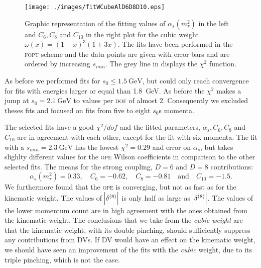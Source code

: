\documentclass[../../index.tex]{subfiles}
\begin{document}
\begin{figure}
  \centering \texttt{[image: ./images/fitWCubeAlD6D8D10.eps]}
  \caption{Graphic representation of the fitting values of
    \(\alpha_s(m_\tau^2)\) in the left and \(C_6, C_8\) and \(C_{10}\) in the
    right plot for the cubic weight \(\omega(x)=(1-x)^3(1+3x)\). The fits have
    been performed in the \textsc{fopt} scheme and the data points are given
    with error bars and are ordered by increasing \(s_{min}\). The grey line in
    displays the \(\chi^2\) function.}
  \label{fig:fitWCubeAlpha}
\end{figure}

As before we performed fits for \(s_0 \leq \SI{1.5}{\giga\eV}\), but could only
reach convergence for fits with energies larger or equal than
\SI{1.8}{\giga\eV}. As before the \(\chi^2\) makes a jump at
\(s_0=\SI{2.1}{\giga\eV}\) to values per \textsc{dof} of almost \(2\).
Consequently we excluded theses fits and focused on fits from five to eight
\(s_0\)s momenta.

The selected fits have a good \(\chi^2/dof\) and the fitted parameters,
\(\alpha_s, C_6, C_8\) and \(C_{10}\) are in agreement with each other, except
for the fit with six momenta. The fit with a \(s_{min}=\SI{2.3}{\giga\eV}\) has
the lowest \(\chi^2=0.29\) and error on \(\alpha_s\), but takes slighlty
different values for the \textsc{ope} Wilson coefficients in comparison to the
other selected fits. The means for the strong coupling, \(D=6\) and \(D=8\)
contributions:
\begin{equation}
  \label{eq:wKinResult}
  \alpha_s(m_\tau^2)=0.33, \quad C_6=-0.62, \quad C_8=-0.81 \quad \text{and} \quad C_{10}=-1.5.
\end{equation}
We furthermore found that the \textsc{ope} is converging, but not as fast as for
the kinematic weight. The values of \(\abs{\delta^{(8)}}\) is only half as large
as \(\abs{\delta^{(8)}}\). The values of the lower momentum count are in high
agreement with the ones obtained from the kinematic weight. The conclusions that
we take from the \textit{cubic weight} are that the kinematic weight, with its
double pinching, should sufficiently suppress any contributions from
\textsc{DV}s. If \textsc{DV} would have an effect on the kinematic weight, we
should have seen an improvement of the fits with the \textit{cubic} weight, due
to its triple pinching, which is not the case.
\end{document}
